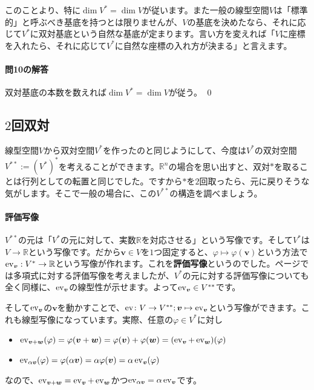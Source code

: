 このことより、特に$\dim V^* = \dim V$が従います。また一般の線型空間$V$は「標準的」と呼ぶべき基底を持つとは限りませんが、$V$の基底を決めたなら、それに応じて$V^*$に双対基底という自然な基底が定まります。言い方を変えれば「$V$に座標を入れたら、それに応じて$V^*$に自然な座標の入れ方が決まる」と言えます。

\paragraph{問10の解答} 双対基底の本数を数えれば$\dim V^* = \dim V$が従う。 \qed

\subsection{$2$回双対}

線型空間$V$から双対空間$V^*$を作ったのと同じようにして、今度は$V^*$の双対空間$V^{**} := (V^*)^*$を考えることができます。$\mathbb{R}^n$の場合を思い出すと、双対$*$を取ることは行列としての転置と同じでした。ですから$*$を$2$回取ったら、元に戻りそうな気がします。そこで一般の場合に、この$V^{**}$の構造を調べましょう。

\paragraph{評価写像} $V^{**}$の元は「$V^{*}$の元に対して、実数$\mathbb{R}$を対応させる」という写像です。そして$V^{*}$は$V\rightarrow\mathbb{R}$という写像です。だから$\bm{v} \in V$を$1$つ固定すると、$\varphi\mapsto \varphi(\bm{v})$という方法で$\operatorname{ev}_{\boldsymbol{v}}:V^{*}\rightarrow \mathbb{R}$という写像が作れます。これを\textbf{評価写像}というのでした。\pageref{paragraph:evaluation_map}ページでは多項式に対する評価写像を考えましたが、$V^*$の元に対する評価写像についても全く同様に、$\operatorname{ev}_{\boldsymbol{v}}$の線型性が示せます。よって$\operatorname{ev}_{\boldsymbol{v}}\in V^{**}$です。

そして$\operatorname{ev}_{\boldsymbol{v}}$の$\bm{v}$を動かすことで、$\operatorname{ev}\colon V\rightarrow V^{**}; \boldsymbol{v}\mapsto \operatorname{ev}_{\boldsymbol{v}}$という写像ができます。これも線型写像になっています。実際、任意の$\varphi \in V^*$に対し
\begin{itemize}
\item $\operatorname{ev}_{\boldsymbol{v} + \boldsymbol{w}}(\varphi) = \varphi(\boldsymbol{v} + \boldsymbol{w}) = \varphi(\boldsymbol{v}) + \varphi(\boldsymbol{w}) = (\operatorname{ev}_{\boldsymbol{v}} + \operatorname{ev}_{\boldsymbol{w}})(\varphi)$
\item $\operatorname{ev}_{\alpha\boldsymbol{v}}(\varphi) = \varphi(\alpha\boldsymbol{v}) = \alpha \varphi(\boldsymbol{v}) = \alpha \operatorname{ev}_{\boldsymbol{v}}(\varphi)$
\end{itemize}
なので、$\operatorname{ev}_{\boldsymbol{v} + \boldsymbol{w}} = \operatorname{ev}_{\boldsymbol{v}} + \operatorname{ev}_{\boldsymbol{w}}$かつ$\operatorname{ev}_{\alpha\boldsymbol{v}} = \alpha \operatorname{ev}_{\boldsymbol{v}}$です。

